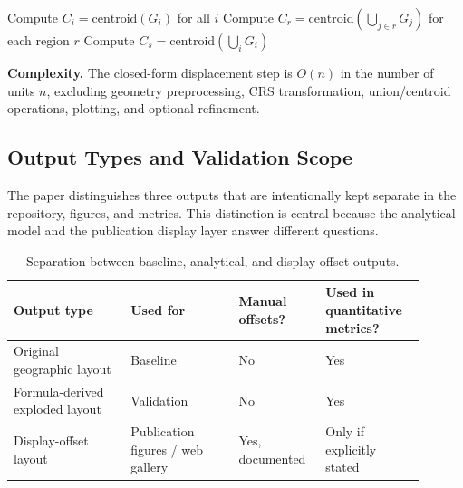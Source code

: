 \documentclass[12pt, a4paper]{article}
\numberwithin{equation}{section}
\begin{document}
\begin{algorithm}[H]
\DontPrintSemicolon
\caption{$\texttt{explode\_map}(G, \text{hierarchy}, \alpha_r, \alpha_l, p)$. The parameters $\alpha_r$ and $\alpha_l$ may be supplied manually or computed from Equations~\eqref{eq:alpha_r_derived}--\eqref{eq:alpha_l_derived} using Analytical Results~1 and~2. Propositions~1--3 guarantee exact geometry preservation, radial ordering, and bounded displacement respectively.}
\BlankLine
Compute $C_i = \text{centroid}(G_i)$ for all $i$\;
Compute $C_{r} = \text{centroid}(\bigcup_{j \in r} G_j)$ for each region $r$\;
Compute $C_s = \text{centroid}(\bigcup_i G_i)$\;
\BlankLine
{}
\;
\end{algorithm}

\vspace{4pt}
\noindent\textbf{Complexity.} The closed-form displacement step is $O(n)$ in the number of units $n$, excluding geometry preprocessing, CRS transformation, union/centroid operations, plotting, and optional refinement.

\subsection{Output Types and Validation Scope}
\label{sec:output_taxonomy}

The paper distinguishes three outputs that are intentionally kept separate in the repository, figures, and metrics. This distinction is central because the analytical model and the publication display layer answer different questions.

\begin{table}[H]
\centering
\caption{Separation between baseline, analytical, and display-offset outputs.}
\label{tab:output-types}
\begin{tabular}{p{0.26\linewidth}p{0.24\linewidth}p{0.18\linewidth}p{0.22\linewidth}}
\toprule
Output type & Used for & Manual offsets? & Used in quantitative metrics? \\
\midrule
Original geographic layout & Baseline & No & Yes \\
Formula-derived exploded layout & Validation & No & Yes \\
Display-offset layout & Publication figures / web gallery & Yes, documented & Only if explicitly stated \\
\bottomrule
\end{tabular}
\end{table}
\end{document}
